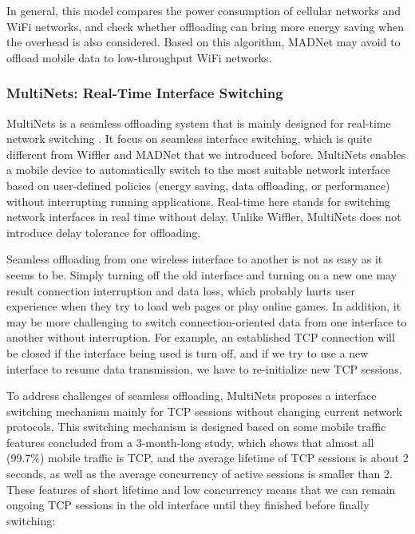 \documentclass[english]{tktltiki}
\begin{document}
In general, this model compares the power consumption of cellular networks and WiFi networks, and check whether offloading can bring more energy saving when the overhead is also considered. Based on this algorithm, MADNet may avoid to offload mobile data to low-throughput WiFi networks.

\subsubsection{MultiNets: Real-Time Interface Switching}

MultiNets is a seamless offloading system that is mainly designed for real-time network switching \cite{nnh+14}. It focus on seamless interface switching, which is quite different from Wiffler and MADNet that we introduced before. MultiNets enables a mobile device to automatically switch to the most suitable network interface based on user-defined policies (energy saving, data offloading, or performance) without interrupting running applications. Real-time here stands for switching network interfaces in real time without delay. Unlike Wiffler, MultiNets does not introduce delay tolerance for offloading.

Seamless offloading from one wireless interface to another is not as easy as it seems to be. Simply turning off the old interface and turning on a new one may result connection interruption and data loss, which probably hurts user experience when they try to load web pages or play online games. In addition, it may be more challenging to switch connection-oriented data from one interface to another without interruption. For example, an established TCP connection will be closed if the interface being used is turn off, and if we try to use a new interface to resume data transmission, we have to re-initialize new TCP sessions.

To address challenges of seamless offloading, MultiNets proposes a interface switching mechanism mainly for TCP sessions without changing current network protocols. This switching mechanism is designed based on some mobile traffic features concluded from a 3-month-long study, which shows that almost all (99.7\%) mobile traffic is TCP, and the average lifetime of TCP sessions is about 2 seconds, as well as the average concurrency of active sessions is smaller than 2. These features of short lifetime and low concurrency means that we can remain ongoing TCP sessions in the old interface until they finished before finally switching:
\end{document}
